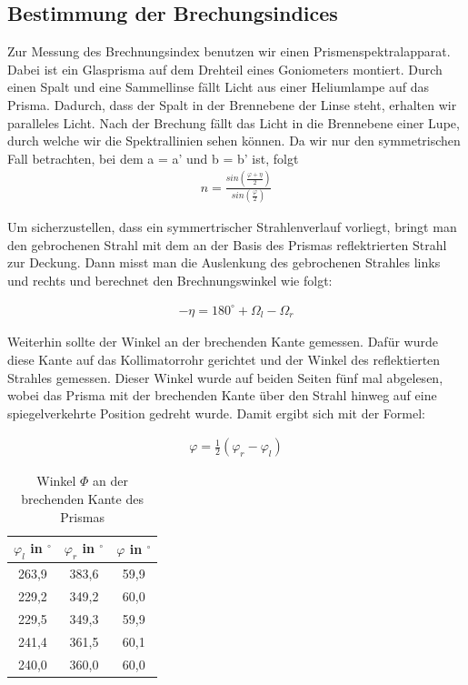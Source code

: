 \subsection{Bestimmung der Brechungsindices}

Zur Messung des Brechnungsindex benutzen wir einen Prismenspektralapparat.
Dabei ist ein Glasprisma auf dem Drehteil eines Goniometers montiert. Durch
einen Spalt und eine Sammellinse fällt Licht aus einer Heliumlampe auf
das Prisma. Dadurch, dass der Spalt in der Brennebene der Linse steht, erhalten
wir paralleles Licht. Nach der Brechung fällt das Licht in die Brennebene einer Lupe, durch welche wir
die Spektrallinien sehen können.
Da wir nur den symmetrischen Fall betrachten, bei dem a = a' und b = b'
ist, folgt
\begin{align}
n=\frac{sin(\frac{\varphi + \eta}{2})}{sin(\frac{\varphi}{2})}\nonumber
\end{align}

Um sicherzustellen, dass ein symmertrischer Strahlenverlauf vorliegt, bringt
man den gebrochenen Strahl mit dem an der Basis des Prismas reflektrierten
Strahl zur Deckung. Dann misst man die Auslenkung des gebrochenen Strahles
links und rechts und berechnet den Brechnungswinkel wie folgt:

\begin{align}
-\eta=180^\circ +\Omega_l - \Omega_r \nonumber
\end{align}

Weiterhin sollte der Winkel an der brechenden Kante gemessen. Dafür wurde
diese Kante auf das Kollimatorrohr gerichtet und der Winkel des reflektierten
Strahles gemessen. Dieser Winkel wurde auf beiden Seiten fünf mal abgelesen,
wobei das Prisma mit der brechenden Kante über den Strahl hinweg auf eine
spiegelverkehrte Position gedreht wurde. Damit ergibt sich mit der Formel:

\begin{align}
\varphi=\frac{1}{2} (\varphi_r - \varphi_l) \nonumber
\end{align}

\begin{table}[h]
\begin{center}
\begin{tabular}[c]{|c|c|c|} \hline
$\varphi_l$ in $^\circ$ & $\varphi_r$ in $^\circ$ & $\varphi$  in $^\circ$\\ \hline
263,9 & 383,6 & 59,9 \\ 
229,2 & 349,2 & 60,0 \\ 
229,5 & 349,3 & 59,9 \\ 
241,4 & 361,5 & 60,1 \\ 
240,0 & 360,0 & 60,0 \\ \hline
\end{tabular}
\caption{Winkel $\Phi$ an der brechenden Kante des Prismas}
\end{center}
\end{table}

